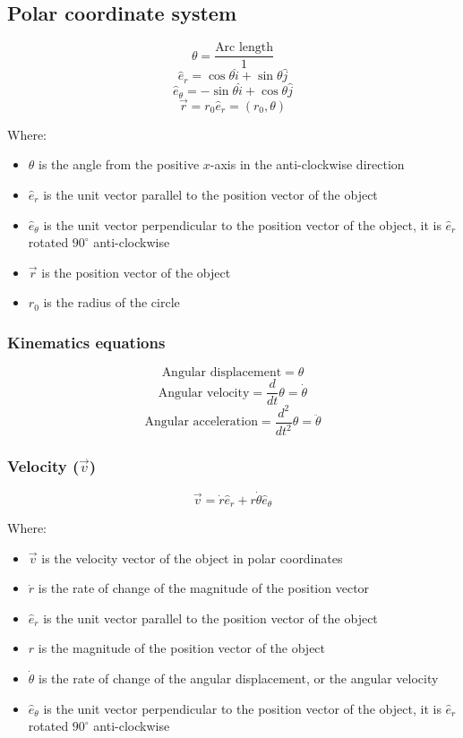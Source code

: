 \documentclass[11pt]{article}
\begin{document}
\subsection{Polar coordinate system}
\label{sec:orgd855e6e}
\[\theta = \frac{\text{Arc length}}{1}\]
\[\hat{e}_r = \cos \theta \hat{i} + \sin \theta \hat{j}\]
\[\hat{e}_{\theta} = - \sin \theta \hat{i} + \cos \theta \hat{j}\]
\[\vec{r} = r_0 \hat{e}_r = (r_0, \theta)\]

Where:
\begin{itemize}
\item \(\theta\) is the angle from the positive \(x\)-axis in the anti-clockwise direction
\item \(\hat{e}_r\) is the unit vector parallel to the position vector of the object
\item \(\hat{e}_{\theta}\) is the unit vector perpendicular to the position vector of the object, it is \(\hat{e}_r\) rotated \(90^{\circ}\) anti-clockwise
\item \(\vec{r}\) is the position vector of the object
\item \(r_0\) is the radius of the circle
\end{itemize}

\subsubsection{Kinematics equations}
\label{sec:org03a9fad}
\[\text{Angular displacement} = \theta\]
\[\text{Angular velocity} = \frac{d}{dt} \theta = \dot{\theta}\]
\[\text{Angular acceleration} = \frac{d^2}{dt^2} \theta = \ddot{\theta}\]

\subsubsection{Velocity (\(\vec{v}\))}
\label{sec:org226cbb3}
\[\vec{v} = \dot{r} \hat{e}_r + r \dot{\theta} \hat{e}_{\theta}\]

Where:
\begin{itemize}
\item \(\vec{v}\) is the velocity vector of the object in polar coordinates
\item \(\dot{r}\) is the rate of change of the magnitude of the position vector
\item \(\hat{e}_r\) is the unit vector parallel to the position vector of the object
\item \(r\) is the magnitude of the position vector of the object
\item \(\dot{\theta}\) is the rate of change of the angular displacement, or the angular velocity
\item \(\hat{e}_{\theta}\) is the unit vector perpendicular to the position vector of the object, it is \(\hat{e}_r\) rotated \(90^{\circ}\) anti-clockwise
\end{itemize}
\end{document}
